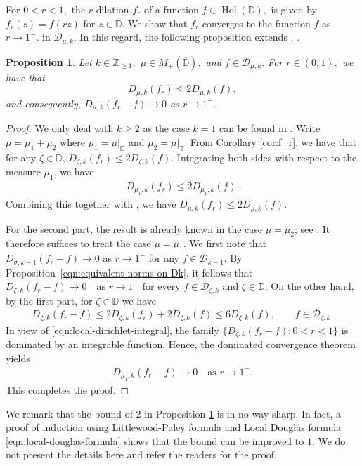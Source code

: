 \documentclass[10pt,oneside,reqno]{amsart}
\newtheorem{proposition}[theorem]{Proposition}
\theoremstyle{definition}
\theoremstyle{remark}
\renewcommand{\le}{\leqslant}
\renewcommand{\ge}{\geqslant}
\newcommand{\D}{\mathbb D}
\newcommand{\T}{\mathbb T}
\numberwithin{equation}{section}
\begin{document}
For $0<r<1,$ the $r$-dilation $f_r$ of a function $f\in  \operatorname{Hol} (\D),$ is given by $f_r(z)=f(rz)$ for $z\in \D.$  We show that $f_r$ converges to the function $f$ as $r\to 1^{-}. $ in $\mathscr D_{\mu, k}.$ In this regard, the following proposition extends \cite[Lemma 4.1]{1993multiplication}, \cite[Corollary 1.5]{MR2019HM}.
\begin{proposition} \label{prop:dilations}
    Let $k\in \mathbb Z_{\geqslant 1},$ $\mu\in M_+(\overline{\D}),$  and $f\in \mathscr D_{\mu, k}.$ For $r \in (0,1),$ we have that 
    \begin{equation*}
        D_{\mu, k} (f_r) \le 2 D_{\mu, k} (f),
    \end{equation*}
    and consequently,  $D_{\mu, k} (f_r - f) \to 0 $  as $r \to 1^{-}.$
\end{proposition}
    
\begin{proof}
    We only deal with $k\ge 2$ as the case $k=1$ can be found in \cite[Corollary 1.5]{MR2019HM}. Write $\mu=\mu_1+\mu_2$ where $\mu_1 = \mu |_{\D}$ and $\mu_2 = \mu |_{\T}$. From Corollary \ref{cor:f_r}, we have that for any $\zeta \in \D$, $D_{\zeta, k} (f_r) \le 2 D_{\zeta, k} (f)$. Integrating both sides with respect to the measure $\mu_1$, we have  
    \begin{align*}
        D_{\mu_{1}, k} (f_r) \le 2 D_{\mu_{1}, k} (f).
    \end{align*}
    Combining this together with \cite[Theorem 1.1]{GGR22}, we have $D_{\mu, k} (f_r) \le 2 D_{\mu, k} (f).$

For the second part, the result is already known in the case $\mu=\mu_2$; see \cite[Theorem 1.1]{GGR22}. It therefore suffices to treat the case $\mu=\mu_1.$ We first note that $D_{\sigma,k-1}(f_r - f) \to 0$ as $r \to 1^{-}$ for any $f \in \mathscr{D}_{k-1}$. By Proposition~\ref{eqn:equivalent-norms-on-Dk}, it follows that $
D_{\zeta,k}(f_r - f) \to 0 \quad \text{as } r \to 1^{-} $
for every $f \in \mathscr{D}_{\zeta,k}$ and $\zeta \in \mathbb{D}.$ On the other hand, by the first part, for $\zeta \in \mathbb{D}$ we have
\begin{align*}
 D_{\zeta,k}(f_r - f)
\leqslant 2 D_{\zeta,k}(f_r) + 2 D_{\zeta,k}(f)
\leqslant 6 D_{\zeta,k}(f), \qquad f \in \mathscr{D}_{\zeta,k}.   
\end{align*}
In view of \eqref{eqn:local-dirichlet-integral}, the family $\{D_{\zeta,k}(f_r - f) : 0 < r < 1\}$ is dominated by an integrable function. Hence, the dominated convergence theorem yields
\begin{align*}
    D_{\mu_1,k}(f_r - f) \to 0 \quad \text{as } r \to 1^{-}.
\end{align*}
This completes the proof.  
\end{proof}
 We remark that the bound of $2$ in Proposition \ref{prop:dilations} is in no way sharp. In fact, a proof of induction using Littlewood-Paley formula and Local Douglas formula \eqref{eqn:local-douglas-formula} shows that the bound can be improved to $1$. We do not present the details here and refer the readers \cite[Theorem 2.6]{GGRLDF} for the proof. 
\end{document}
